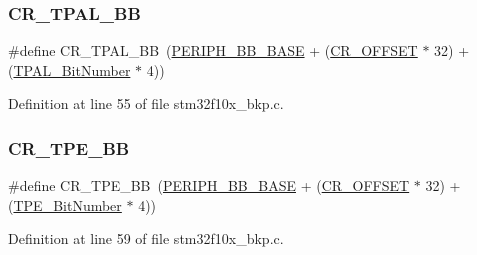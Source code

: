 \mbox{\label{group___b_k_p___private___defines_gaa36e52f37b9fa6982bd224a6dcb86f78}} 
\subsubsection{\texorpdfstring{C\+R\+\_\+\+T\+P\+A\+L\+\_\+\+BB}{CR\_TPAL\_BB}}
{\footnotesize\ttfamily \#define C\+R\+\_\+\+T\+P\+A\+L\+\_\+\+BB~(\hyperlink{group___peripheral__memory__map_gaed7efc100877000845c236ccdc9e144a}{P\+E\+R\+I\+P\+H\+\_\+\+B\+B\+\_\+\+B\+A\+SE} + (\hyperlink{group___r_c_c___private___defines_gafa1d3d0ea72132df651c76fc1bdffffc}{C\+R\+\_\+\+O\+F\+F\+S\+ET} $\ast$ 32) + (\hyperlink{group___b_k_p___private___defines_ga4af1869d665b8804104b6754c787820a}{T\+P\+A\+L\+\_\+\+Bit\+Number} $\ast$ 4))}



Definition at line 55 of file stm32f10x\+\_\+bkp.\+c.

\mbox{\label{group___b_k_p___private___defines_ga6c11e801c2c1aa87ec2feaefe12bbb96}} 
\subsubsection{\texorpdfstring{C\+R\+\_\+\+T\+P\+E\+\_\+\+BB}{CR\_TPE\_BB}}
{\footnotesize\ttfamily \#define C\+R\+\_\+\+T\+P\+E\+\_\+\+BB~(\hyperlink{group___peripheral__memory__map_gaed7efc100877000845c236ccdc9e144a}{P\+E\+R\+I\+P\+H\+\_\+\+B\+B\+\_\+\+B\+A\+SE} + (\hyperlink{group___r_c_c___private___defines_gafa1d3d0ea72132df651c76fc1bdffffc}{C\+R\+\_\+\+O\+F\+F\+S\+ET} $\ast$ 32) + (\hyperlink{group___b_k_p___private___defines_ga8c68be900246b028ff4af93ad119eb98}{T\+P\+E\+\_\+\+Bit\+Number} $\ast$ 4))}



Definition at line 59 of file stm32f10x\+\_\+bkp.\+c.

